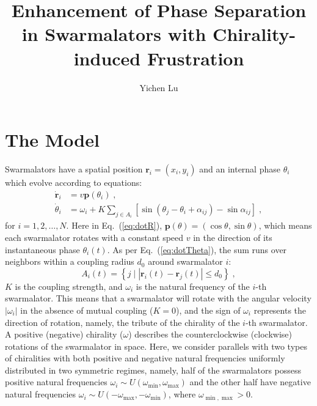 \documentclass{article}
\title{\textbf{Enhancement of Phase Separation in Swarmalators with Chirality-induced Frustration}}
\author{Yichen Lu}
\begin{document}
\maketitle

\tableofcontents

\newpage
\section{\label{sec:model}The Model}

Swarmalators have a spatial position $\mathbf{r}_i=\left( x_i, y_i \right)$ and an internal phase $\theta_i$ which evolve according to equations:
\begin{subequations}
    \label{eq:totalDynamics}
    \begin{align}
        \dot{\mathbf{r}}_i&=v\mathbf{p}\left( \theta _i \right)\label{eq:dotR}\;,\\
        \dot{\theta}_i&=\omega _i+K\sum_{j\in A_i}{\left[ \sin \left( \theta _j-\theta _i+\alpha _{ij} \right) -\sin \alpha _{ij} \right]}\label{eq:dotTheta}\;,
    \end{align}
\end{subequations}
for $i=1,2,\ldots,N$. Here in Eq.~(\ref{eq:dotR}), $\mathbf{p}\left( \theta \right) =\left( \cos \theta ,\sin \theta \right)$, which means each swarmalator rotates with a constant speed $v$ in the direction of its instantaneous phase $\theta_i (t)$. As per Eq.~(\ref{eq:dotTheta}), the sum runs over neighbors within a coupling radius $d_0$ around swarmalator $i$:
\begin{equation}
    A_i\left( t \right) =\left\{ j\mid \left| \mathbf{r}_i\left( t \right) -\mathbf{r}_j\left( t \right) \right|\leqslant d_0 \right\} \;,
\end{equation}
$K$ is the coupling strength, and $\omega_i$ is the natural frequency of the $i$-th swarmalator. 
This means that a swarmalator will rotate with the angular velocity $|\omega_i |$ in the absence of mutual coupling ($K=0$), and the sign of $\omega_i$ represents the direction of rotation, namely, the tribute of the chirality of the $i$-th swarmalator. A positive (negative) chirality ($\omega$) describes the counterclockwise (clockwise) rotations of the swarmalator in space. Here, we consider parallels with two types of chiralities with both positive and negative natural frequencies uniformly distributed in two symmetric regimes, namely, half of the swarmalators possess positive natural frequencies $\omega_i \sim U\left( \omega _{\min},\omega _{\max} \right)$ and the other half have negative natural frequencies $\omega_i \sim U\left( -\omega _{\max},-\omega _{\min} \right)$, where $\omega _{\min, \max}>0$.
\end{document}
